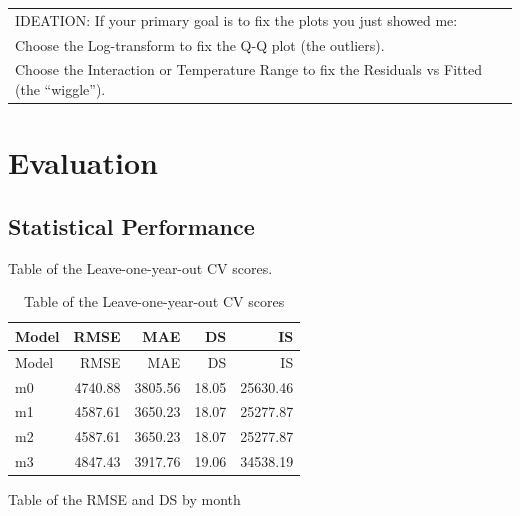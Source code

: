 \documentclass[
]{article}
\begin{document}
\begin{longtable}[]{@{}
  >{\raggedright\arraybackslash}p{}@{}}
\toprule\noalign{}
\endhead
\bottomrule\noalign{}
\endlastfoot
IDEATION: If your primary goal is to fix the plots you just showed
me: \\
Choose the Log-transform to fix the Q-Q plot (the outliers). \\
Choose the Interaction or Temperature Range to fix the Residuals vs
Fitted (the ``wiggle''). \\
\end{longtable}

\section{Evaluation}\label{evaluation}

\subsection{Statistical Performance}\label{statistical-performance}

Table of the Leave-one-year-out CV scores.

\begin{longtable}[]{@{}lrrrr@{}}
\caption{Table of the Leave-one-year-out CV scores}\tabularnewline
\toprule\noalign{}
Model & RMSE & MAE & DS & IS \\
\midrule\noalign{}
\endfirsthead
\toprule\noalign{}
Model & RMSE & MAE & DS & IS \\
\midrule\noalign{}
\endhead
\bottomrule\noalign{}
\endlastfoot
m0 & 4740.88 & 3805.56 & 18.05 & 25630.46 \\
m1 & 4587.61 & 3650.23 & 18.07 & 25277.87 \\
m2 & 4587.61 & 3650.23 & 18.07 & 25277.87 \\
m3 & 4847.43 & 3917.76 & 19.06 & 34538.19 \\
\end{longtable}

Table of the RMSE and DS by month
\end{document}
